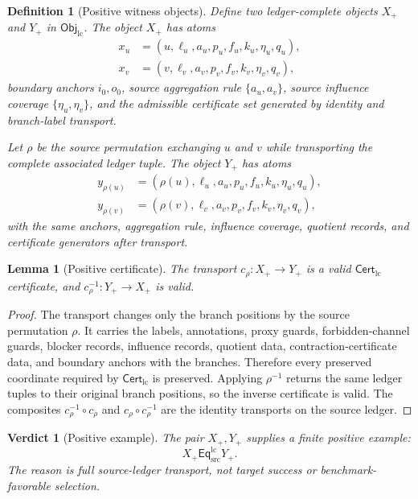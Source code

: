 \documentclass[11pt]{article}
\newcommand{\EqLC}{\mathsf{Eq}_{\mathrm{src}}^{\mathrm{lc}}}
\newcommand{\ObjLC}{\mathsf{Obj}_{\mathrm{lc}}}
\newcommand{\CertLC}{\mathsf{Cert}_{\mathrm{lc}}}
\newtheorem{definition}{Definition}
\newtheorem{lemma}{Lemma}
\newtheorem{verdict}{Verdict}
\begin{document}
\begin{definition}[Positive witness objects]
Define two ledger-complete objects \(X_+\) and \(Y_+\) in \(\ObjLC\).
The object \(X_+\) has atoms
\[
\begin{aligned}
    x_u&=(u,\ell_u,a_u,p_u,f_u,k_u,\eta_u,q_u),\\
    x_v&=(v,\ell_v,a_v,p_v,f_v,k_v,\eta_v,q_v),
\end{aligned}
\]
boundary anchors \(i_0,o_0\), source aggregation rule
\(\{a_u,a_v\}\), source influence coverage \(\{\eta_u,\eta_v\}\), and
the admissible certificate set generated by identity and branch-label
transport.

Let \(\rho\) be the source permutation exchanging \(u\) and \(v\) while
transporting the complete associated ledger tuple. The object \(Y_+\)
has atoms
\[
\begin{aligned}
    y_{\rho(u)}&=(\rho(u),\ell_u,a_u,p_u,f_u,k_u,\eta_u,q_u),\\
    y_{\rho(v)}&=(\rho(v),\ell_v,a_v,p_v,f_v,k_v,\eta_v,q_v),
\end{aligned}
\]
with the same anchors, aggregation rule, influence coverage, quotient
records, and certificate generators after transport.
\end{definition}

\begin{lemma}[Positive certificate]
The transport \(c_{\rho}:X_+\to Y_+\) is a valid \(\CertLC\)
certificate, and \(c_{\rho}^{-1}:Y_+\to X_+\) is valid.
\end{lemma}

\begin{proof}
The transport changes only the branch positions by the source
permutation \(\rho\). It carries the labels, annotations, proxy guards,
forbidden-channel guards, blocker records, influence records, quotient
data, contraction-certificate data, and boundary anchors with the
branches. Therefore every preserved coordinate required by \(\CertLC\)
is preserved. Applying \(\rho^{-1}\) returns the same ledger tuples to
their original branch positions, so the inverse certificate is valid.
The composites \(c_{\rho}^{-1}\circ c_{\rho}\) and
\(c_{\rho}\circ c_{\rho}^{-1}\) are the identity transports on the
source ledger.
\end{proof}

\begin{verdict}[Positive example]
The pair \(X_+,Y_+\) supplies a finite positive example:
\[
    X_+ \EqLC Y_+ .
\]
The reason is full source-ledger transport, not target success or
benchmark-favorable selection.
\end{verdict}
\end{document}
